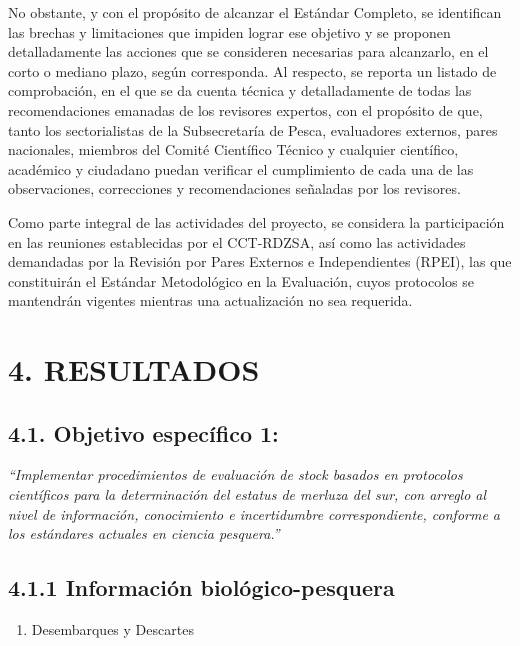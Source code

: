 \documentclass[
  spanish,
]{article}
\providecommand{\tightlist}{%
  \setlength{\itemsep}{0pt}\setlength{\parskip}{0pt}}
\begin{document}
No obstante, y con el propósito de alcanzar el Estándar Completo, se
identifican las brechas y limitaciones que impiden lograr ese objetivo y
se proponen detalladamente las acciones que se consideren necesarias
para alcanzarlo, en el corto o mediano plazo, según corresponda. Al
respecto, se reporta un listado de comprobación, en el que se da cuenta
técnica y detalladamente de todas las recomendaciones emanadas de los
revisores expertos, con el propósito de que, tanto los sectorialistas de
la Subsecretaría de Pesca, evaluadores externos, pares nacionales,
miembros del Comité Científico Técnico y cualquier científico, académico
y ciudadano puedan verificar el cumplimiento de cada una de las
observaciones, correcciones y recomendaciones señaladas por los
revisores.

Como parte integral de las actividades del proyecto, se considera la
participación en las reuniones establecidas por el CCT-RDZSA, así como
las actividades demandadas por la Revisión por Pares Externos e
Independientes (RPEI), las que constituirán el Estándar Metodológico en
la Evaluación, cuyos protocolos se mantendrán vigentes mientras una
actualización no sea requerida.

\pagebreak

\hypertarget{resultados}{%
\section{4. RESULTADOS}\label{resultados}}

\hypertarget{objetivo-especuxedfico-1-1}{%
\subsection{4.1. Objetivo específico
1:}\label{objetivo-especuxedfico-1-1}}

\emph{``Implementar procedimientos de evaluación de stock basados en
protocolos científicos para la determinación del estatus de merluza del
sur, con arreglo al nivel de información, conocimiento e incertidumbre
correspondiente, conforme a los estándares actuales en ciencia
pesquera.''}

\hypertarget{informaciuxf3n-bioluxf3gico-pesquera-1}{%
\subsection{4.1.1 Información
biológico-pesquera}\label{informaciuxf3n-bioluxf3gico-pesquera-1}}

\begin{enumerate}
\def\labelenumi{\alph{enumi})}
\tightlist
\item
  Desembarques y Descartes
\end{enumerate}
\end{document}
